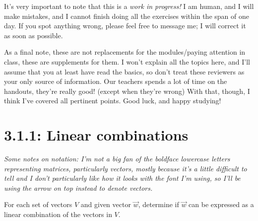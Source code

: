 \documentclass{article}
\begin{document}
It's very important to note that this is a \textit{work in progress!} I am human, and I will make mistakes, and I cannot finish doing all the exercises within the span of one day. If you spot anything wrong, 
please feel free to message me; I will correct it as soon as possible.\par
As a final note, these are not replacements for the modules/paying attention in class, these are supplements for them. I won't explain all the topics here, and I'll assume that you at least have 
read the basics, so don't treat these reviewers as your only source of information. Our teachers spends a lot of time on the handouts, they're really good! (except when they're wrong) With that, though, I think 
I've covered all pertinent points. Good luck, and happy studying!

\section*{3.1.1: Linear combinations}
\textit{Some notes on notation: I'm not a big fan of the boldface lowercase letters representing matrices, particularly vectors, mostly because it's a little difficult to tell and I don't 
particularly like how it looks with the font I'm using, so I'll be using the arrow on top instead to denote vectors.}\par
\begin{center}
    \colorbox{CornflowerBlue!50}{
    \begin{minipage}[c]{0.9\textwidth}
        \centering
        For each set of vectors \(V\) and given vector \(\overrightarrow{w}\), determine if \(\overrightarrow{w}\) can be expressed as a linear combination of the vectors in \(V\). 
    \end{minipage}
    }
\end{center}
\end{document}
